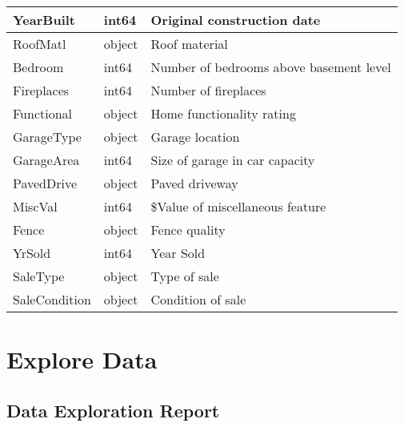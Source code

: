 \begin{longtable}{|p{3cm}|p{3cm}|p{6.6cm}|}
YearBuilt   & int64     & Original construction date \\ \hline
RoofMatl    & object    & Roof material \\ \hline
Bedroom     & int64     & Number of bedrooms above basement level \\ \hline
Fireplaces  & int64     & Number of fireplaces \\ \hline
Functional  & object    & Home functionality rating \\ \hline
GarageType  & object    & Garage location \\ \hline
GarageArea  & int64     & Size of garage in car capacity \\ \hline
PavedDrive  & object    & Paved driveway \\ \hline
MiscVal     & int64     & \$Value of miscellaneous feature \\ \hline
Fence       & object    & Fence quality \\ \hline
YrSold      & int64     & Year Sold \\ \hline
SaleType    & object    & Type of sale \\ \hline
SaleCondition & object  & Condition of sale \\ \hline
\end{longtable}

\section{Explore Data}

\subsection{Data Exploration Report}

